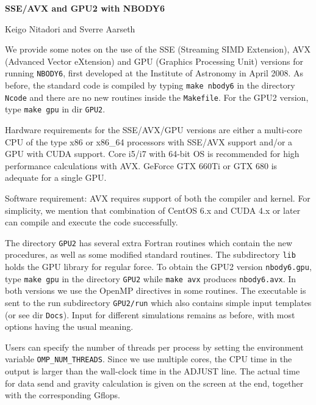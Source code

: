 \documentclass[12pt]{article}
\begin{document}
\centerline {\Large {\bf {SSE/AVX and GPU2 with NBODY6}}}
\bigskip
\bigskip
\centerline {\Large {Keigo Nitadori and Sverre Aarseth~~~}}
\bigskip
\medskip
\bigskip
We provide some notes on the use of the SSE (Streaming SIMD Extension),
AVX (Advanced Vector eXtension)
and GPU (Graphics Processing Unit) versions for running
{\tt NBODY6}, first developed at the Institute of Astronomy in April 2008. 
As before, the standard code is compiled by typing {\tt make nbody6} in the
directory {\tt Ncode} and there are no new routines inside the {\tt Makefile}.
For the GPU2 version, type {\tt make gpu} in dir {\tt GPU2}.
\medskip

Hardware requirements for the SSE/AVX/GPU versions are either a multi-core
CPU of the type x86 or x86\_64 processors with SSE/AVX support and/or
a GPU with CUDA support. Core i5/i7 with 64-bit OS is recommended for high
performance calculations with AVX.
GeForce GTX 660Ti or GTX 680 is adequate for a single GPU.
\medskip

Software requirement: 
AVX requires support of both the compiler and kernel.
For simplicity, we mention that combination of CentOS 6.x
and CUDA 4.x or later can compile and execute the code successfully.

\medskip

The directory {\tt GPU2} has several extra Fortran routines which contain the
new procedures, as well as some modified standard routines.
The subdirectory {\tt lib} holds the GPU library for regular force.
To obtain the GPU2 version {\tt nbody6.gpu}, type {\tt make gpu} in the 
directory {\tt GPU2} while {\tt make avx} produces {\tt nbody6.avx}.
In both versions we use the OpenMP directives in some routines.
The executable is sent to the run subdirectory {\tt GPU2/run} which
also contains simple input templates (or see dir {\tt Docs}).
Input for different simulations remains as before, with most options
having the usual meaning.
\medskip

Users can specify the number of threads per process by setting the
environment variable {\tt OMP\_NUM\_THREADS}.
Since we use multiple cores, the CPU time in the output is larger
than the wall-clock time in the ADJUST line. The actual time for data
send and gravity calculation is given on the screen at the end, together
with the corresponding Gflops.
\end{document}
